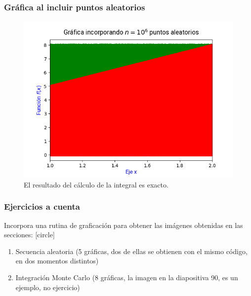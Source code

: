 \begin{frame}
\frametitle{Gráfica al incluir puntos aleatorios}
\begin{figure}[h!]
    \centering
    \includegraphics[scale=0.55]{Imagenes/area_puntos_06.png}
    \caption{El resultado del cálculo de la integral es exacto.}
\end{figure}
\end{frame}
\begin{frame}
\frametitle{Ejercicios a cuenta}
Incorpora una rutina de graficación para obtener las imágenes obtenidas en las secciones:
[circle]
\begin{enumerate}[<+->]
\item Secuencia aleatoria (5 gráficas, dos de ellas se obtienen con el mismo código, en dos momentos distintos)
\item Integración Monte Carlo (8 gráficas, la imagen en la diapositiva 90, es un ejemplo, no ejercicio)
\end{enumerate}
\end{frame}
